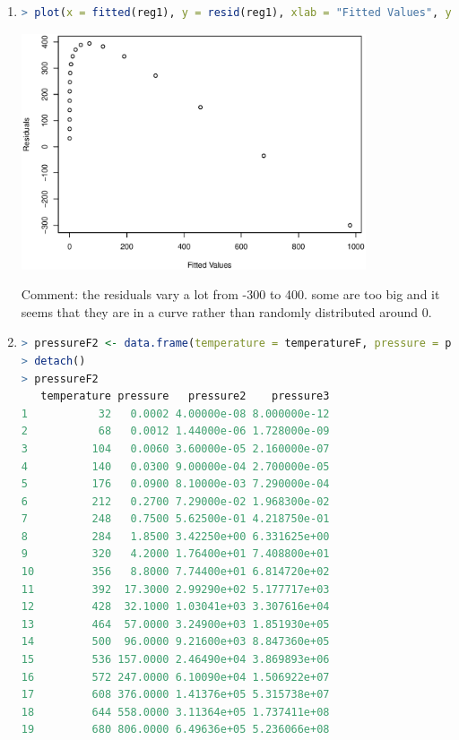 \documentclass{article}
\begin{document}
\begin{enumerate}[leftmargin = 0 em, label = \arabic*., font = \bfseries]
\begin{enumerate}
Comment: According to the summary and the plot, this is not a good model to fit the data. The p-value is small and the fitted result in the plot is not good.


\item 
\begin{lstlisting}[language = R]
> plot(x = fitted(reg1), y = resid(reg1), xlab = "Fitted Values", ylab = "Residuals")
\end{lstlisting}
\begin{center}
\includegraphics[width = 0.8\textwidth]{reg1resid.eps}
\end{center}
Comment: the residuals vary a lot from -300 to 400. some are too big and it seems that they are in a curve rather than randomly distributed around 0.


\item 
\begin{lstlisting}[language = R]
> pressureF2 <- data.frame(temperature = temperatureF, pressure = pressure, pressure2 = pressure^2, pressure3 = pressure^3)
> detach()
> pressureF2
   temperature pressure   pressure2    pressure3
1           32   0.0002 4.00000e-08 8.000000e-12
2           68   0.0012 1.44000e-06 1.728000e-09
3          104   0.0060 3.60000e-05 2.160000e-07
4          140   0.0300 9.00000e-04 2.700000e-05
5          176   0.0900 8.10000e-03 7.290000e-04
6          212   0.2700 7.29000e-02 1.968300e-02
7          248   0.7500 5.62500e-01 4.218750e-01
8          284   1.8500 3.42250e+00 6.331625e+00
9          320   4.2000 1.76400e+01 7.408800e+01
10         356   8.8000 7.74400e+01 6.814720e+02
11         392  17.3000 2.99290e+02 5.177717e+03
12         428  32.1000 1.03041e+03 3.307616e+04
13         464  57.0000 3.24900e+03 1.851930e+05
14         500  96.0000 9.21600e+03 8.847360e+05
15         536 157.0000 2.46490e+04 3.869893e+06
16         572 247.0000 6.10090e+04 1.506922e+07
17         608 376.0000 1.41376e+05 5.315738e+07
18         644 558.0000 3.11364e+05 1.737411e+08
19         680 806.0000 6.49636e+05 5.236066e+08
\end{lstlisting}


\end{enumerate}
\end{enumerate}
\end{document}
